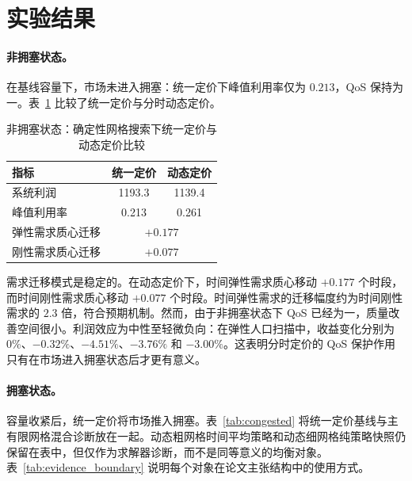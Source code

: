 \documentclass[UTF8,11pt,a4paper]{ctexart}
\begin{document}
\section{实验结果}
\label{sec:results}

\paragraph{非拥塞状态。}

在基线容量下，市场未进入拥塞：统一定价下峰值利用率仅为 $0.213$，QoS 保持为一。表~\ref{tab:uncongested} 比较了统一定价与分时动态定价。

\begin{table}[H]
\centering
\caption{非拥塞状态：确定性网格搜索下统一定价与动态定价比较}
\label{tab:uncongested}
\begin{tabular}{lcc}
\toprule
指标 & 统一定价 & 动态定价 \\
\midrule
系统利润 & 1193.3 & 1139.4 \\
峰值利用率 & 0.213 & 0.261 \\
弹性需求质心迁移 & \multicolumn{2}{c}{$+0.177$} \\
刚性需求质心迁移 & \multicolumn{2}{c}{$+0.077$} \\
\bottomrule
\end{tabular}
\end{table}

需求迁移模式是稳定的。在动态定价下，时间弹性需求质心移动 $+0.177$ 个时段，而时间刚性需求质心移动 $+0.077$ 个时段。时间弹性需求的迁移幅度约为时间刚性需求的 $2.3$ 倍，符合预期机制。然而，由于非拥塞状态下 QoS 已经为一，质量改善空间很小。利润效应为中性至轻微负向：在弹性人口扫描中，收益变化分别为 $0\%$、$-0.32\%$、$-4.51\%$、$-3.76\%$ 和 $-3.00\%$。这表明分时定价的 QoS 保护作用只有在市场进入拥塞状态后才更有意义。

\paragraph{拥塞状态。}

容量收紧后，统一定价将市场推入拥塞。表~\ref{tab:congested} 将统一定价基线与主有限网格混合诊断放在一起。动态粗网格时间平均策略和动态细网格纯策略快照仍保留在表中，但仅作为求解器诊断，而不是同等意义的均衡对象。表~\ref{tab:evidence_boundary} 说明每个对象在论文主张结构中的使用方式。
\end{document}
